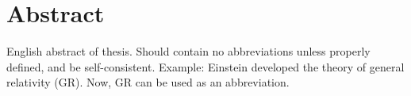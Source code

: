 
\section{Abstract}

English abstract of thesis. Should contain no abbreviations unless properly defined, and be self-consistent. 
Example: Einstein developed the theory of general relativity (GR). Now, GR can be used as an abbreviation.
